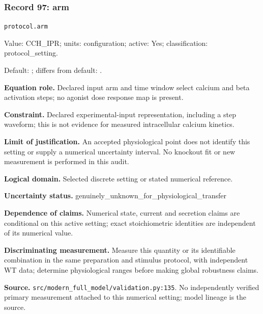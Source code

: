 \subsubsection*{Record 97: arm}
{\small \nolinkurl{protocol.arm}\par

Value: CCH\_IPR; units: configuration; active: Yes; classification: protocol\_setting.\par

Default: ; differs from default: .\par

\textbf{Equation role.} Declared input arm and time window select calcium and beta activation steps; no agonist dose response map is present.\par

\textbf{Constraint.} Declared experimental-input representation, including a step waveform; this is not evidence for measured intracellular calcium kinetics.\par

\textbf{Limit of justification.} An accepted physiological point does not identify this setting or supply a numerical uncertainty interval. No knockout fit or new measurement is performed in this audit.\par

\textbf{Logical domain.} Selected discrete setting or stated numerical reference.\par

\textbf{Uncertainty status.} genuinely\_unknown\_for\_physiological\_transfer\par

\textbf{Dependence of claims.} Numerical state, current and secretion claims are conditional on this active setting; exact stoichiometric identities are independent of its numerical value.\par

\textbf{Discriminating measurement.} Measure this quantity or its identifiable combination in the same preparation and stimulus protocol, with independent WT data; determine physiological ranges before making global robustness claims.\par

\textbf{Source.} \nolinkurl{src/modern_full_model/validation.py:135}. No independently verified primary measurement attached to this numerical setting; model lineage is the source.\par}

